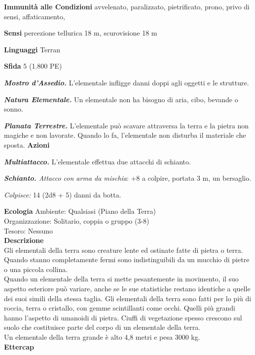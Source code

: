 \begin{multicols}{2}
\textbf{Immunità alle Condizioni} avvelenato, paralizzato, pietrificato, prono, privo di sensi, affaticamento,

\textbf{Sensi} percezione tellurica 18 m, scurovisione 18 m

\textbf{Linguaggi} Terran

\textbf{Sfida} 5 (1.800 PE)

\emph{\textbf{Mostro d'Assedio.}} L'elementale infligge danni doppi agli oggetti e le strutture.

\emph{\textbf{Natura Elementale.}} Un elementale non ha bisogno di aria, cibo, bevande o sonno.

\emph{\textbf{Planata Terrestre.}} L'elementale può scavare attraversa la terra e la pietra non magiche e non lavorate. Quando lo fa, l'elementale non disturba il materiale che sposta. 
\textbf{Azioni}

\emph{\textbf{Multiattacco.}} L'elementale effettua due attacchi di schianto.

\emph{\textbf{Schianto.} Attacco con arma da mischia}: +8 a colpire, portata 3 m, un bersaglio.

\emph{Colpisce:} 14 (2d8 + 5) danni da botta.

\textbf{Ecologia}
Ambiente: Qualsiasi (Piano della Terra)\\
Organizzazione: Solitario, coppia o gruppo (3-8)\\
Tesoro: Nessuno\\
\textbf{Descrizione}\\
Gli elementali della terra sono creature lente ed ostinate fatte di pietra o terra. Quando stanno completamente fermi sono indistinguibili da un mucchio di pietre o una piccola collina.\\

Quando un elementale della terra si mette pesantemente in movimento, il suo aspetto esteriore può variare, anche se le sue statistiche restano identiche a quelle dei suoi simili della stessa taglia. Gli elementali della terra sono fatti per lo più di roccia, terra o cristallo, con gemme scintillanti come occhi. Quelli più grandi hanno l'aspetto di umanoidi di pietra. Ciuffi di vegetazione spesso crescono sul suolo che costituisce parte del corpo di un elementale della terra.\\

Un elementale della terra grande è alto 4,8 metri e pesa 3000 kg.\\


\medskip{}\textbf{Ettercap}


\end{multicols}
